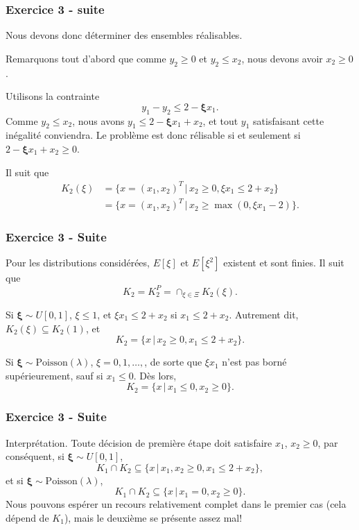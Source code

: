 \documentclass{beamer}
\def\bxi{\boldsymbol\xi}
\begin{document}
\begin{frame}
\frametitle{Exercice 3 - suite}

Nous devons donc déterminer des ensembles réalisables.

\mbox{}

Remarquons tout d'abord que comme $y_2 \geq 0$ et $y_2 \leq x_2$, nous
devons avoir $x_2 \geq 0$.

\mbox{}

Utilisons la contrainte
\[
y_1 - y_2 \leq 2-\bxi x_1.
\]
Comme $y_2 \leq x_2$, nous avons $y_1 \leq 2-\bxi x_1 + x_2$, et tout
$y_1$ satisfaisant cette inégalité conviendra. Le
problème est donc rélisable si et seulement si $2-\bxi x_1 + x_2 \geq 0$.

Il suit que
\begin{align*}
K_2(\xi) &= \lbrace x = (x_1, x_2)^T \,|\, x_2 \geq 0, \xi x_1 \leq
2+x_2 \rbrace \\
&= \lbrace  x = (x_1, x_2)^T \,|\, x_2 \geq \max(0, \xi x_1 -2 ) \rbrace.
\end{align*}

\end{frame}

\begin{frame}
\frametitle{Exercice 3 - Suite}

Pour les distributions considérées, $E[\xi]$ et $E[\xi^2]$ existent et
sont finies. Il suit que
\[
K_2 = K_2^P = \cap_{\xi \in \Xi} K_2(\xi).
\]

\mbox{}

Si $\bxi \sim U[0,1]$, $\xi \leq 1$, et $\xi x_1 \leq 2 + x_2$ si $x_1
\leq 2 + x_2$. Autrement dit, $K_2(\xi) \subseteq K_2(1)$, et
\[
K_2 = \lbrace x \,|\, x_2 \geq 0, x_1 \leq 2 + x_2 \rbrace.
\]

\mbox{}

Si $\bxi \sim \mbox{Poisson}(\lambda)$, $\xi = 0, 1,\ldots,$, de sorte
que $\xi x_1$ n'est pas borné supérieurement, sauf si $x_1 \leq
0$. Dès lors,
\[
K_2 = \lbrace x \,|\, x_1 \leq 0, x_2 \geq 0 \rbrace.
\]

\end{frame}

\begin{frame}
\frametitle{Exercice 3 - Suite}

Interprétation. Toute décision de première étape doit satisfaire
$x_1$, $x_2 \geq 0$, par conséquent, si $\bxi \sim U[0,1]$,
\[
K_1 \cap K_2 \subseteq \lbrace x \,|\, x_1, x_2 \geq 0, x_1 \leq 2+x_2
\rbrace,
\]
et si $\bxi \sim \mbox{Poisson}(\lambda)$,
\[
K_1 \cap K_2 \subseteq \lbrace x \,|\, x_1 = 0, x_2 \geq 0 \rbrace.
\]
Nous pouvons espérer un recours relativement complet dans le premier
cas (cela dépend de $K_1$), mais le deuxième se présente assez mal!

\end{frame}
\end{document}
